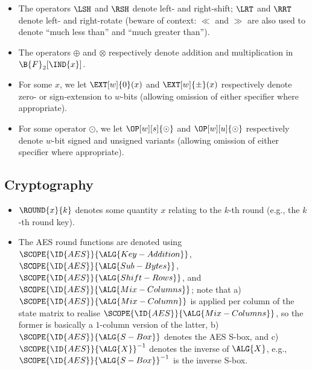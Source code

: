 \begin{itemize}

\item The operators $\LSH$ and $\RSH$ denote left- and right-shift; $\LRT$ and
      $\RRT$ denote left- and right-rotate (beware of context: $\ll$ and $\gg$
      are also used to denote ``much less than'' and ``much greater than'').
\item The operators 
      $\oplus$
      and
      $\otimes$
      respectively denote addition and multiplication in $\B{F}_2[\IND{x}]$.
\item For some $x$, 
      we let
      $\EXT[w]{0  }( x )$
      and
      $\EXT[w]{\pm}( x )$
      respectively denote
      zero- or sign-extension to $w$-bits
      (allowing omission of either specifier where appropriate).
\item For some operator $\odot$, 
      we let
      $\OP[w][s]{\odot}$
      and 
      $\OP[w][u]{\odot}$
      respectively denote 
      $w$-bit signed and unsigned variants
      (allowing omission of either specifier where appropriate).

\end{itemize}


\subsection{Cryptography}

\begin{itemize}

\item $\ROUND{x}{k}$ denotes some quantity $x$ relating to the $k$-th 
      round (e.g., the $k$-th round key).
\item The AES round functions are denoted using
      $\SCOPE{\ID{AES}}{\ALG{Key-Addition}}$,
      $\SCOPE{\ID{AES}}{\ALG{Sub-Bytes}}$,
      $\SCOPE{\ID{AES}}{\ALG{Shift-Rows}}$,
      and
      $\SCOPE{\ID{AES}}{\ALG{Mix-Columns}}$;
      note that 
      a) $\SCOPE{\ID{AES}}{\ALG{Mix-Column}}$ is applied per column of the
         state matrix to realise $\SCOPE{\ID{AES}}{\ALG{Mix-Columns}}$, so
         the former is basically a $1$-column version of the latter,
      b) $\SCOPE{\ID{AES}}{\ALG{S-Box}}$ denotes the AES S-box,
         and
      c) $\SCOPE{\ID{AES}}{\ALG{X}}^{-1}$ denotes the inverse of $\ALG{X}$,
         e.g., $\SCOPE{\ID{AES}}{\ALG{S-Box}}^{-1}$ is the inverse S-box.

\end{itemize}

